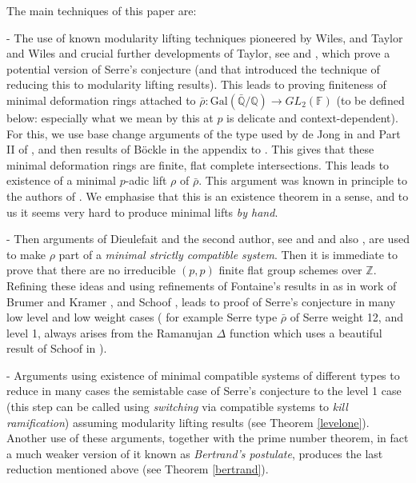 \documentclass[12pt]{article}
\newcommand{\Z}{\mathbb{Z}}
\newcommand{\FF}{ {\mathbb F} }
\def\rhob{ {\bar {\rho} } }
\newcommand{\Galois}{\mathrm{Gal}}
\newcommand{\Gal}{\Galois( \bar{ {\mathbb Q}}/{\mathbb Q})}
\begin{document}
\vspace{.5cm}

The main techniques  of this paper are:

- The use of known modularity lifting techniques pioneered by
Wiles, and Taylor and Wiles
and crucial
further developments of Taylor, see \cite{[T02]} and \cite{[T03]},
which prove a potential version of Serre's conjecture (and that
introduced  the  technique of reducing this to modularity lifting results).
This leads to proving finiteness of minimal deformation rings
attached to $\rhob:\Gal \rightarrow GL_2(\FF)$ (to be defined below:
especially
what we mean by this at $p$ is delicate and context-dependent). For this,
we use
base change arguments of the type
used by de Jong in \cite{[dJ01]} and Part II of \cite{BoKh}, and then
results of B\"ockle in the
appendix to \cite{[K03]}.
This gives that these minimal deformation rings
are finite, flat complete intersections. This leads to
existence of a minimal $p$-adic lift $\rho$ of $\rhob$.
This argument was known in principle
to the authors of \cite{[KR03]}.
We emphasise that this is an existence theorem in a sense, and to us it
seems
very hard to produce minimal lifts {\it by hand}.


- Then arguments of Dieulefait and the second author, see
 \cite{D}
and \cite{Wint} and also \cite{[T03]},
are used to make
$\rho$ part of a {\it minimal strictly compatible system}.
Then it is immediate to
prove that there are no irreducible $(p,p)$ finite flat group schemes over
$\Z$. Refining these ideas and using refinements of Fontaine's results
 in
\cite{Fontaine} as
in work of Brumer and Kramer \cite{BK}, and Schoof \cite{Schoof1}, leads to
proof of Serre's conjecture in many low level and low weight cases (
for example Serre type $\rhob$ of Serre weight 12, and level 1, always
arises from the Ramanujan $\Delta$ function
which uses a beautiful result of Schoof in \cite{Schoof1}).

- Arguments using existence of minimal compatible systems of different types
to reduce in many cases the semistable case of Serre's conjecture to
the level 1 case (this step can be called using {\it switching} via
compatible
systems to {\it kill ramification}) assuming modularity lifting results
(see Theorem \ref{levelone}). Another use of these arguments, together
with
the prime number theorem, in fact a much weaker version of it known as {\it
Bertrand's postulate}, produces the last reduction mentioned above (see
Theorem \ref{bertrand}).
\end{document}
